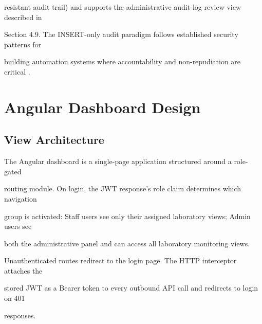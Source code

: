 resistant audit trail) and supports the administrative audit-log review view described in

Section 4.9. The INSERT-only audit paradigm follows established security patterns for

building automation systems where accountability and non-repudiation are critical
\cite{alturjman2024,nguyen2025}.


\section{Angular Dashboard Design}

\subsection{View Architecture}
The Angular dashboard is a single-page application structured around a role-gated

routing module. On login, the JWT response's role claim determines which navigation

group is activated: Staff users see only their assigned laboratory views; Admin users see

both the administrative panel and can access all laboratory monitoring views.

Unauthenticated routes redirect to the login page. The HTTP interceptor attaches the

stored JWT as a Bearer token to every outbound API call and redirects to login on 401

responses.


